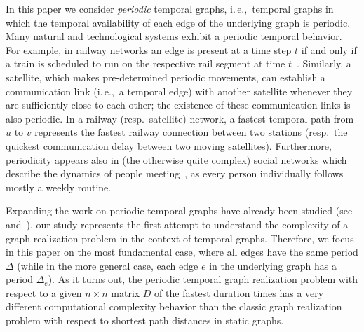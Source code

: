 \documentclass[a4paper,UKenglish,cleveref, autoref, thm-restate]{lipics-v2021}
\newcommand{\ie}{i.\,e.,\ }
\begin{document}
In this paper we consider \emph{periodic} temporal graphs, \ie temporal graphs in which the temporal availability of each edge of the underlying graph is periodic. 
Many natural and technological systems exhibit a periodic temporal behavior. For example, in railway networks an edge is present at a time step $t$ if and
only if a train is scheduled to run on the respective rail segment at time $t$~\cite{Arrighi2023Multi}. 
Similarly, a satellite, which makes pre-determined periodic movements, can establish a communication link (\ie a temporal edge) with another satellite whenever they are sufficiently close to each other; the existence of these communication links is also periodic. 
In a railway (resp.~satellite) network, a fastest temporal path from $u$ to $v$ represents the fastest railway connection between two stations 
(resp.~the quickest communication delay between two moving satellites). 
Furthermore, periodicity appears also in (the otherwise quite complex) social networks which describe the dynamics of people meeting~\cite{snapnets,sapiezynski2015tracking}, as every person individually follows mostly a weekly routine.%


Expanding the work on periodic temporal graphs have already been studied 
(see~\cite[Class 8]{casteigts2012time} and~\cite{Arrighi2023Multi,ErlebachS20,morawietz2021timecop,morawietz2020timecop}), 
our study represents the first attempt to understand the complexity of a graph realization problem in the context of temporal graphs. 
Therefore, we focus in this paper on the most fundamental case, where all edges have the same period $\Delta$ 
(while in the more general case, each edge $e$ in the underlying graph has a period $\Delta_e$).
As it turns out, the periodic temporal graph realization problem with respect to a given $n \times n$ matrix $D$ of the fastest duration times has a very different computational complexity behavior than the classic graph realization problem with respect to shortest path distances in static graphs. 









\end{document}
